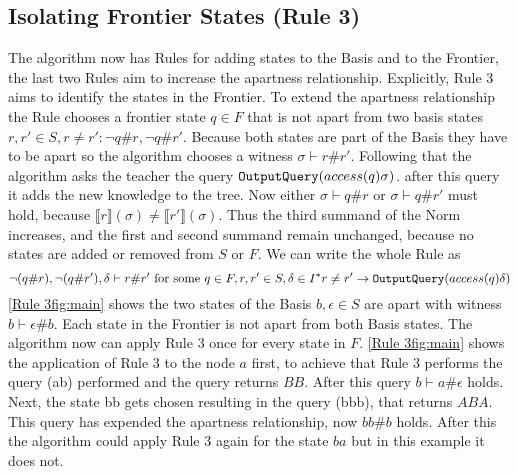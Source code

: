 \subsection{Isolating Frontier States (Rule 3)}
The algorithm now has Rules for adding states to the Basis and to the Frontier, the last two Rules aim to increase the apartness relationship. Explicitly, Rule 3 aims to identify the states in the Frontier. To extend the apartness relationship the Rule chooses a frontier state $q\in F$ that is not apart from two basis states $r,r'\in S, r\neq r':\neg q\#r,\neg q\#r'$. Because both states are part of the Basis they have to be apart so the algorithm chooses a witness $\sigma\vdash r\#r'$. Following that the algorithm asks the teacher the query $\textnormal{\texttt{OutputQuery}}(access(q)\sigma)$. after this query it adds the new knowledge to the tree. Now either $\sigma\vdash q\#r$ or $\sigma\vdash q\#r'$ must hold, because $\llbracket r\rrbracket(\sigma)\neq\llbracket r' \rrbracket (\sigma)$. Thus the third summand of the Norm increases, and the first and second summand remain unchanged, because no states are added or removed from $S$ or $F$. We can write the whole Rule as $$
\neg (q\#r),\neg(q\#r'),\delta\vdash r\#r' \text{ for some } q\in F, r,r'\in S, \delta\in I^* r\neq r' \rightarrow \textnormal{\texttt{OutputQuery}}(access(q) \delta)
$$
\autoref{Rule 3fig:main} shows the two states of the Basis $b,\epsilon\in S$ are apart with witness $b\vdash\epsilon\#b$. Each state in the Frontier is not apart from both Basis states. The algorithm now can apply Rule 3 once for every state in $F$. \autoref{Rule 3fig:main} shows the application of Rule 3 to the node $a$ first, to achieve that Rule 3 performs the query \oquery(ab) performed and the query returns $BB$. After this query $b\vdash a\#\epsilon$ holds. Next, the state bb gets chosen resulting in the query \oquery(bbb), that returns $ABA$. This query has expended the apartness relationship, now $bb\#b$ holds. After this the algorithm could apply Rule 3 again for the state $ba$ but in this example it does not. 
